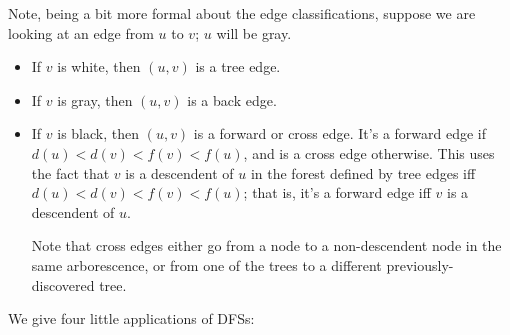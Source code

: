 \documentclass{article}
\begin{document}
Note, being a bit more formal about the edge classifications, 
suppose we are looking at an edge from $u$ to $v$; $u$
will be gray.
\begin{itemize}
	\item If $v$ is white, then $(u,v)$ is a tree edge.
	\item If $v$ is gray, then $(u,v)$ is a back edge.
	\item If $v$ is black, then $(u,v)$ is a forward or cross edge.
	It's a forward edge if $d(u) < d(v) < f(v) < f(u)$, and is
	a cross edge otherwise.
	This uses the fact that $v$ is a descendent of $u$ in the forest defined
	by tree edges iff $d(u) < d(v) < f(v) < f(u)$; that is, it's a forward
	edge iff $v$ is a descendent of $u$.
	
	Note that cross edges either go from a node to a non-descendent node in
	the same arborescence, or from one of the trees to a different 
	previously-discovered tree.
\end{itemize}
We give four little applications of DFSs:
\end{document}
